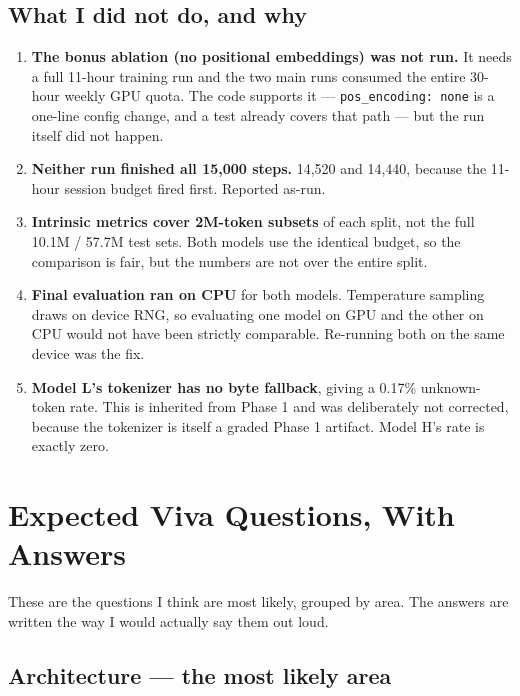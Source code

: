 \documentclass[11pt]{report}
\newcommand{\p}[1]{\texttt{#1}}
\begin{document}
\section{What I did not do, and why}

\begin{warnbox}
\begin{enumerate}[leftmargin=*]
\item \textbf{The bonus ablation (no positional embeddings) was not run.} It
      needs a full 11-hour training run and the two main runs consumed the entire
      30-hour weekly GPU quota. The code supports it --- \p{pos\_encoding: none}
      is a one-line config change, and a test already covers that path --- but the
      run itself did not happen.
\item \textbf{Neither run finished all 15,000 steps.} 14,520 and 14,440, because
      the 11-hour session budget fired first. Reported as-run.
\item \textbf{Intrinsic metrics cover 2M-token subsets} of each split, not the
      full 10.1M / 57.7M test sets. Both models use the identical budget, so the
      comparison is fair, but the numbers are not over the entire split.
\item \textbf{Final evaluation ran on CPU} for both models. Temperature sampling
      draws on device RNG, so evaluating one model on GPU and the other on CPU
      would not have been strictly comparable. Re-running both on the same device
      was the fix.
\item \textbf{Model L's tokenizer has no byte fallback}, giving a 0.17\%
      unknown-token rate. This is inherited from Phase 1 and was deliberately not
      corrected, because the tokenizer is itself a graded Phase 1 artifact.
      Model H's rate is exactly zero.
\end{enumerate}
\end{warnbox}


\chapter{Expected Viva Questions, With Answers}
\label{ch:viva}

These are the questions I think are most likely, grouped by area. The answers are
written the way I would actually say them out loud.

\section{Architecture --- the most likely area}
\end{document}
